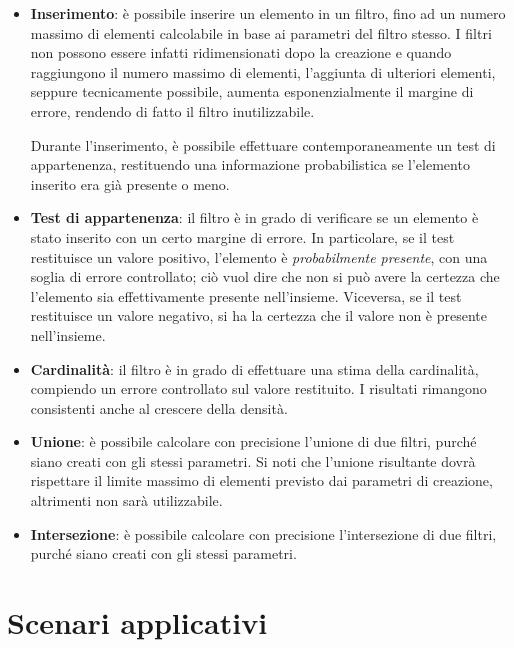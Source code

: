 \begin{itemize}
	\medskip

	\item
	\textbf{Inserimento}: è possibile inserire un elemento in un filtro, fino ad un numero massimo
	di elementi calcolabile in base ai parametri del filtro stesso. I filtri non possono essere
	infatti ridimensionati dopo la creazione e quando raggiungono il numero massimo di elementi,
	l'aggiunta di ulteriori elementi, seppure tecnicamente possibile, aumenta esponenzialmente 
	il margine di errore, rendendo di fatto il filtro inutilizzabile.

	Durante l'inserimento, è possibile effettuare contemporaneamente un test di appartenenza,
	restituendo una informazione probabilistica se l'elemento inserito era già presente o meno.

	\item
	\textbf{Test di appartenenza}: il filtro è in grado di verificare se un elemento è stato
	inserito con un certo margine di errore. In particolare, se il test restituisce un valore
	positivo, l'elemento è \emph{probabilmente presente}, con una soglia di errore controllato;
	ciò vuol dire che non si può avere la certezza che l'elemento sia effettivamente presente
	nell'insieme. Viceversa, se il test restituisce un valore negativo, si ha la certezza che il
	valore non è presente nell'insieme.

	\item
	\textbf{Cardinalità}: il filtro è in grado di effettuare una stima della cardinalità, compiendo
	un errore controllato sul valore restituito. I risultati rimangono consistenti anche al crescere
	della densità.

	\item
	\textbf{Unione}: è possibile calcolare con precisione l'unione di due filtri, purché siano
	creati con gli stessi parametri. Si noti che l'unione risultante dovrà rispettare il limite
	massimo di elementi previsto dai parametri di creazione, altrimenti non sarà utilizzabile.

	\item
	\textbf{Intersezione}: è possibile calcolare con precisione l'intersezione di due filtri,
	purché siano creati con gli stessi parametri.

\end{itemize}

\section{Scenari applicativi}

